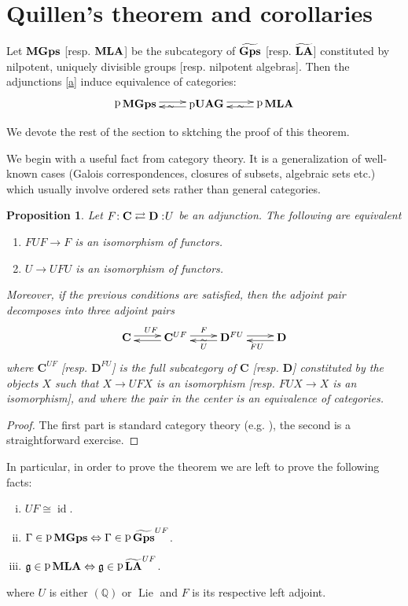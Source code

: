 \documentclass{amsart}
\newtheorem{prop}[thm]{Proposition}
\theoremstyle{definition}
\theoremstyle{remark}
\theoremstyle{remark}
\newcommand{\Q}{\mathbb{Q}}
\newcommand{\cat}{\mathbf{C}}%
\newcommand{\catd}{\mathbf{D}}%
\newcommand{\ra}{\rightarrow}
\newcommand{\mfg}{\mathfrak{g}}
\newcommand{\adj}[4]{#1\negmedspace: #2\rightleftarrows #3:\negmedspace #4}
\DeclareMathOperator{\id}{id}
\DeclareMathOperator{\Lie}{Lie}
\DeclareMathOperator{\pro}{{p}}
\DeclareMathOperator{\Gps}{\bf{Gps}}
\DeclareMathOperator{\LA}{\bf{LA}}
\DeclareMathOperator{\MGps}{\bf{MGps}}
\DeclareMathOperator{\MLA}{\bf{MLA}}
\DeclareMathOperator{\pUAG}{p\bf{UAG}}
\begin{document}
\section{Quillen's theorem and corollaries}

\begin{thm}[Quillen]Let $\MGps$ [resp. $\MLA$] be the subcategory of $\widetilde{\Gps}$ [resp. $\widetilde{\LA}$] constituted by nilpotent, uniquely divisible groups [resp. nilpotent algebras]. Then the adjunctions \eqref{a} induce equivalence of categories:
$$\xymatrix{\pro\MGps\ar@<0.5ex>[r]_\sim&\pUAG\ar@<0.5ex>[l]\ar@<0.5ex>[r]_\sim&\pro\MLA\ar@<0.5ex>[l]}$$
\end{thm}

We devote the rest of the section to sktching the proof of this theorem.

We begin with a useful fact from category theory. It is a generalization of well-known cases (Galois correspondences, closures of subsets, algebraic sets etc.) which usually involve ordered sets rather than general categories.

\begin{prop}\label{formal}
Let $\adj{F}{\cat}{\catd}{U}$ be an adjunction. The following are equivalent
\begin{enumerate}
	\item $FUF\ra F$ is an isomorphism of functors.
	\item $U\ra UFU$ is an isomorphism of functors.
\end{enumerate}
Moreover, if the previous conditions are satisfied, then the adjoint pair decomposes into three adjoint pairs
$$\xymatrix{\cat\ar@<0.5ex>[r]^{UF}&\cat^{UF}\ar@<0.5ex>[l]\ar@<0.5ex>[r]^{F}_\sim&\catd^{FU}\ar@<0.5ex>[l]^{U}\ar@<0.5ex>[r]&\catd\ar@<0.5ex>[l]^{FU}}$$
where $\cat^{UF}$ [resp. $\catd^{FU}$] is the full subcategory of $	\cat$ [resp. $\catd$] constituted by the objects $X$ such that $X\ra UFX$ is an isomorphism [resp. $FUX\ra X$ is an isomorphism], and where the pair in the center is an equivalence of categories.
\end{prop}

\begin{proof}
The first part is standard category theory (e.g. \cite[Lemma 4.3]{ls}), the second is a straightforward exercise.
\end{proof}
In particular, in order to prove the theorem we are left to prove the following facts:
\begin{enumerate}[(i)]
	\item $UF\cong\id$.
	\item $\Gamma\in\pro\MGps\Leftrightarrow\Gamma\in \pro\widetilde{\Gps}^{UF}$.
	\item $\mfg\in\pro\MLA\Leftrightarrow\mfg\in \pro\widetilde{\LA}^{UF}$.
\end{enumerate}
where $U$ is either $(\Q)$ or $\Lie$ and $F$ is its respective left adjoint.
\end{document}
